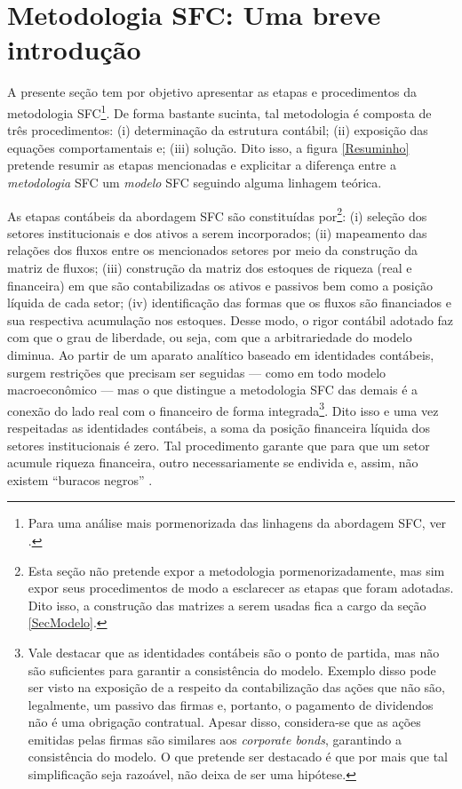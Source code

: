 \section{Metodologia SFC: Uma breve introdução}
\label{IntroSFC}


A presente seção tem por objetivo apresentar as etapas e procedimentos da metodologia  SFC\footnote{Para uma análise mais pormenorizada das linhagens da abordagem SFC, ver \textcite{caverzasi_stock-flow_2013}.}. De forma bastante sucinta, tal metodologia é composta de três procedimentos: (i) determinação da estrutura contábil; (ii) exposição das equações comportamentais e; (iii) solução. Dito isso, a figura \ref{Resuminho} pretende resumir as etapas mencionadas e explicitar a diferença entre a \textit{metodologia} SFC um \textit{modelo} SFC seguindo alguma linhagem teórica. 



As etapas contábeis da abordagem SFC são constituídas por\footnote{Esta seção não pretende expor a metodologia pormenorizadamente, mas sim expor seus procedimentos de modo a esclarecer as etapas que foram adotadas. Dito isso, a construção das matrizes a serem usadas fica a cargo da seção \ref{SecModelo}.}: (i) seleção dos setores institucionais e dos ativos a serem incorporados; (ii) mapeamento das relações dos fluxos entre os mencionados setores por meio da construção da matriz de fluxos; (iii) construção da matriz dos estoques de riqueza (real e financeira) em que são contabilizadas os ativos e passivos  bem como a posição líquida de cada setor; (iv) identificação das formas que os fluxos são financiados e sua respectiva acumulação nos estoques. Desse modo, o rigor contábil adotado faz com que o grau de liberdade, ou seja, com que a arbitrariedade do modelo diminua. 
Ao partir de um aparato analítico baseado em identidades contábeis, surgem restrições que precisam ser seguidas  --- como em todo modelo macroeconômico --- mas o que distingue a metodologia SFC das demais é a conexão do lado real com o financeiro de forma integrada\footnote{Vale destacar que as identidades contábeis são o ponto de partida, mas não são suficientes para garantir a consistência do modelo. Exemplo disso pode ser visto na exposição de  \textcite[p.~27--8]{godley_monetary_2007}  a respeito da contabilização das ações que não são, legalmente, um passivo das firmas e, portanto, o pagamento de dividendos não é uma obrigação contratual. Apesar disso, considera-se que as ações emitidas pelas firmas são similares aos \textit{corporate bonds}, garantindo a consistência do modelo. O que pretende ser destacado é que por mais que tal simplificação seja razoável, não deixa de ser uma hipótese.}. 
Dito isso e uma vez respeitadas as identidades contábeis, a soma da posição financeira líquida dos setores institucionais é zero. Tal procedimento garante que para que um setor acumule riqueza financeira, outro necessariamente se endivida e, assim, não existem ``buracos negros'' \cite{godley_money_1996}. 


